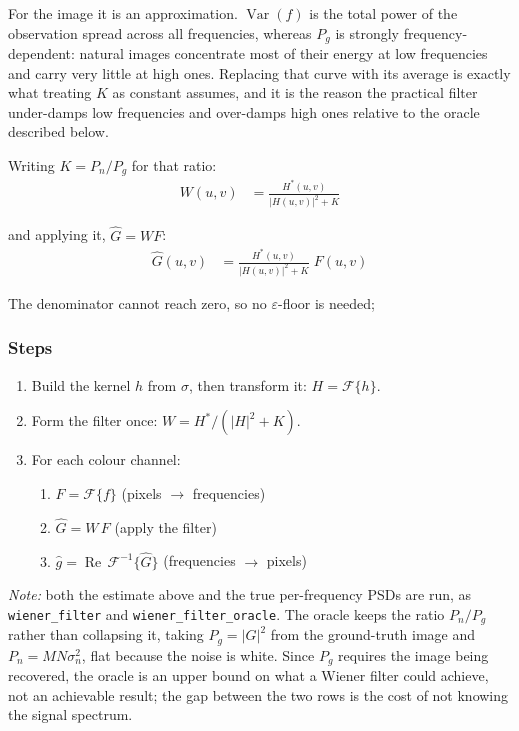\documentclass[10pt,twocolumn,letterpaper]{article}
\begin{document}
\noindent For the image it is an approximation. $\operatorname{Var}(f)$ is the total power
of the observation spread across all frequencies, whereas $P_{g}$ is strongly
frequency-dependent: natural images concentrate most of their energy at low frequencies and
carry very little at high ones. Replacing that curve with its average is exactly what
treating $K$ as constant assumes, and it is the reason the practical filter under-damps low
frequencies and over-damps high ones relative to the oracle described below.

\medskip

\noindent Writing $K = P_{n}/P_{g}$ for that ratio:
\begin{align}
  W(u,v) &= \frac{H^{*}(u,v)}{\left|H(u,v)\right|^{2} + K}
\end{align}

\noindent and applying it, $\hat{G} = W F$:
\begin{align}
  \hat{G}(u,v) &= \frac{H^{*}(u,v)}{\left|H(u,v)\right|^{2} + K}\;F(u,v)
\end{align}

\noindent The denominator cannot reach zero, so no $\varepsilon$-floor is needed;

\subsubsection*{Steps}

\begin{enumerate}
  \item Build the kernel $h$ from $\sigma$, then transform it: $H = \mathcal{F}\{h\}$.
  \item Form the filter once: $W = H^{*} / \left(\left|H\right|^{2} + K\right)$.
  \item For each colour channel:
    \begin{enumerate}
      \item $F = \mathcal{F}\{f\}$ \hfill (pixels $\to$ frequencies)
      \item $\hat{G} = W\,F$ \hfill (apply the filter)
      \item $\hat{g} = \operatorname{Re}\,\mathcal{F}^{-1}\{\hat{G}\}$
            \hfill (frequencies $\to$ pixels)
    \end{enumerate}
\end{enumerate}

\noindent \emph{Note:} both the estimate above and the true per-frequency PSDs are run, as
\texttt{wiener\_filter} and \texttt{wiener\_filter\_oracle}. The oracle keeps the ratio
$P_{n}/P_{g}$ rather than collapsing it, taking $P_{g} = |G|^{2}$ from the ground-truth
image and $P_{n} = MN\sigma_{n}^{2}$, flat because the noise is white. Since $P_{g}$
requires the image being recovered, the oracle is an upper bound on what a Wiener filter
could achieve, not an achievable result; the gap between the two rows is the cost of not
knowing the signal spectrum.
\end{document}
